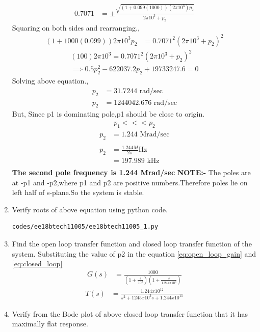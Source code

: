 \begin{enumerate}[label=\thesubsection.\arabic*.,ref=\thesubsection.\theenumi]
\begin{align}
    0.7071 &= \pm{\frac{\sqrt{(1+0.099(1000))(2\pi10^3)p_2}}{2\pi10^3+p_2}}
\end{align}
Squaring on both sides and rearranging.,
\begin{align}
    (1+1000(0.099))2\pi10^3p_2 &= 0.7071^2{(2\pi10^3+p_2)}^2
\end{align}
\begin{align}
    (100)2\pi10^3 = 0.7071^2(2\pi10^3+p_2)^2\\
    \implies 0.5p_2^2-622037.2p_2+19733247.6=0
\end{align}
Solving above equation.,
\begin{align}
p_2 &= 31.7244 \text{ rad/sec}\\
p_2 &= 1244042.676 \text{ rad/sec}
\end{align}
But, Since p1 is dominating pole,p1 should be close to origin.
\begin{align}
    p_1 <<< p_2
\end{align}
\begin{align}
p_2 &= 1.244\text{ Mrad/sec}\\
\\
p_2 &= \frac{1.244M}{2\pi} \text{Hz}\\
&= 197.989\text{ kHz}\\
\end{align}
\textbf{The second pole frequency is 1.244 Mrad/sec}
\textbf{NOTE:-} The poles are at -p1 and -p2,where p1 and p2 are positive numbers.Therefore poles lie on left half of s-plane.So the system is stable.
\item Verify roots of above equation using python code.
\begin{lstlisting}
codes/ee18btech11005/ee18btech11005_1.py
\end{lstlisting}
\item Find the open loop transfer function and closed loop transfer function of the system.
\solution Substituting the value of p2 in  the equation \ref{eq:open_loop_gain} and \ref{eq:closed_loop}
\begin{align}
     G(s) &= \frac{1000}{(1+\frac{s}{10^3})(1+\frac{s}{1.244x10^6})}
\end{align}
\begin{align}
    T(s) &= \frac{1.244x10^{12}}{s^2+1245x10^3s+1.244x10^{11}}
\end{align}
\item Verify from the Bode plot of above closed loop transfer function that it has maximally flat response.\\

\end{enumerate}
